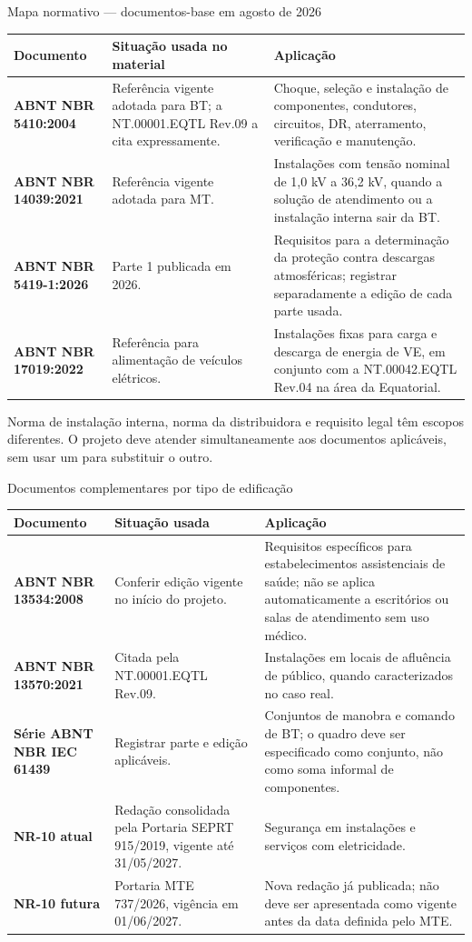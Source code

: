 \begin{frame}{Mapa normativo — documentos-base em agosto de 2026}
\scriptsize
\begin{tabularx}{\textwidth}{>{\bfseries}p{2.75cm}p{2.8cm}X}
\toprule
Documento & Situação usada no material & Aplicação \\
\midrule
ABNT NBR 5410:2004 & Referência vigente adotada para BT; a NT.00001.EQTL Rev.09 a cita expressamente. & Choque, seleção e instalação de componentes, condutores, circuitos, DR, aterramento, verificação e manutenção. \\
ABNT NBR 14039:2021 & Referência vigente adotada para MT. & Instalações com tensão nominal de 1,0 kV a 36,2 kV, quando a solução de atendimento ou a instalação interna sair da BT. \\
ABNT NBR 5419-1:2026 & Parte 1 publicada em 2026. & Requisitos para a determinação da proteção contra descargas atmosféricas; registrar separadamente a edição de cada parte usada. \\
ABNT NBR 17019:2022 & Referência para alimentação de veículos elétricos. & Instalações fixas para carga e descarga de energia de VE, em conjunto com a NT.00042.EQTL Rev.04 na área da Equatorial. \\
\bottomrule
\end{tabularx}
\begin{caixaAt}
Norma de instalação interna, norma da distribuidora e requisito legal têm escopos diferentes. O projeto deve atender simultaneamente aos documentos aplicáveis, sem usar um para substituir o outro.
\end{caixaAt}
\end{frame}

\begin{frame}[shrink=5]{Documentos complementares por tipo de edificação}
\scriptsize
\begin{tabularx}{\textwidth}{>{\bfseries}p{3.15cm}p{2.55cm}X}
\toprule
Documento & Situação usada & Aplicação \\
\midrule
ABNT NBR 13534:2008 & Conferir edição vigente no início do projeto. & Requisitos específicos para estabelecimentos assistenciais de saúde; não se aplica automaticamente a escritórios ou salas de atendimento sem uso médico. \\
ABNT NBR 13570:2021 & Citada pela NT.00001.EQTL Rev.09. & Instalações em locais de afluência de público, quando caracterizados no caso real. \\
Série ABNT NBR IEC 61439 & Registrar parte e edição aplicáveis. & Conjuntos de manobra e comando de BT; o quadro deve ser especificado como conjunto, não como soma informal de componentes. \\
NR-10 atual & Redação consolidada pela Portaria SEPRT 915/2019, vigente até 31/05/2027. & Segurança em instalações e serviços com eletricidade. \\
NR-10 futura & Portaria MTE 737/2026, vigência em 01/06/2027. & Nova redação já publicada; não deve ser apresentada como vigente antes da data definida pelo MTE. \\
\bottomrule
\end{tabularx}
\end{frame}

